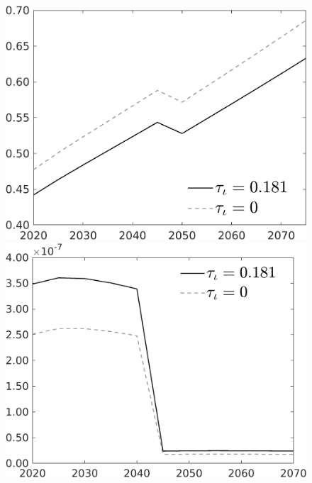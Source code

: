 \documentclass[12pt]{article}
\begin{document}
\begin{figure}[h!!]
\begin{minipage}[]{0.32\textwidth}
	\end{minipage}	
	\begin{minipage}[]{0.32\textwidth}
		\includegraphics[width=1\textwidth]{../../codding_model/own_basedOnFried/optimalPol_010922_revision/figures/all_13Sept22/CompTauf_bytaul_Equlab_Reg0_C_spillover0_nsk0_xgr0_knspil0_sep0_LFlimit1_emsbase0_countec0_GovRev0_etaa0.79_lgd1.png}
	\end{minipage}	
	\begin{minipage}[]{0.32\textwidth}
		\includegraphics[width=1\textwidth]{../../codding_model/own_basedOnFried/optimalPol_010922_revision/figures/all_13Sept22/CompTauf_bytaul_Equlab_Reg0_gAf_spillover0_nsk0_xgr0_knspil0_sep0_LFlimit1_emsbase0_countec0_GovRev0_etaa0.79_lgd1.png}

\end{minipage}
\end{figure}
\end{document}
